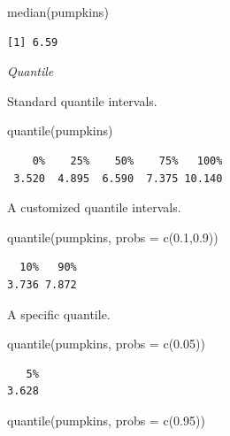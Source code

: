 \documentclass[
  letterpaper,
]{book}
\newenvironment{Shaded}{\begin{snugshade}}{\end{snugshade}}
\newcommand{\AttributeTok}[1]{\textcolor[rgb]{0.40,0.45,0.13}{#1}}
\newcommand{\FloatTok}[1]{\textcolor[rgb]{0.68,0.00,0.00}{#1}}
\newcommand{\FunctionTok}[1]{\textcolor[rgb]{0.28,0.35,0.67}{#1}}
\newcommand{\NormalTok}[1]{\textcolor[rgb]{0.00,0.23,0.31}{#1}}
\begin{document}
\begin{Shaded}
\begin{Highlighting}[]
\FunctionTok{median}\NormalTok{(pumpkins)}
\end{Highlighting}
\end{Shaded}

\begin{verbatim}
[1] 6.59
\end{verbatim}

\emph{Quantile}

Standard quantile intervals.

\begin{Shaded}
\begin{Highlighting}[]
\FunctionTok{quantile}\NormalTok{(pumpkins)}
\end{Highlighting}
\end{Shaded}

\begin{verbatim}
    0%    25%    50%    75%   100% 
 3.520  4.895  6.590  7.375 10.140 
\end{verbatim}

A customized quantile intervals.

\begin{Shaded}
\begin{Highlighting}[]
\FunctionTok{quantile}\NormalTok{(pumpkins, }\AttributeTok{probs =} \FunctionTok{c}\NormalTok{(}\FloatTok{0.1}\NormalTok{,}\FloatTok{0.9}\NormalTok{))}
\end{Highlighting}
\end{Shaded}

\begin{verbatim}
  10%   90% 
3.736 7.872 
\end{verbatim}

A specific quantile.

\begin{Shaded}
\begin{Highlighting}[]
\FunctionTok{quantile}\NormalTok{(pumpkins, }\AttributeTok{probs =} \FunctionTok{c}\NormalTok{(}\FloatTok{0.05}\NormalTok{))}
\end{Highlighting}
\end{Shaded}

\begin{verbatim}
   5% 
3.628 
\end{verbatim}

\begin{Shaded}
\begin{Highlighting}[]
\FunctionTok{quantile}\NormalTok{(pumpkins, }\AttributeTok{probs =} \FunctionTok{c}\NormalTok{(}\FloatTok{0.95}\NormalTok{))}
\end{Highlighting}
\end{Shaded}
\end{document}
